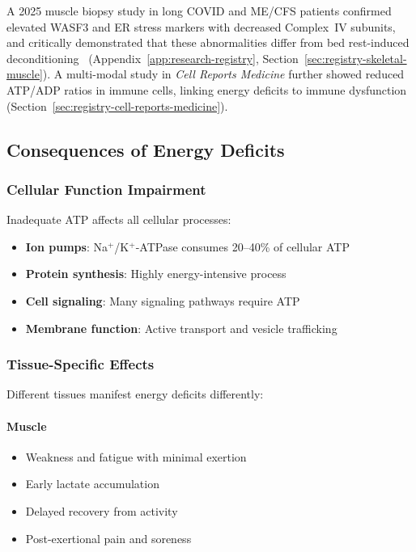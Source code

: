 A 2025 muscle biopsy study in long COVID and ME/CFS patients confirmed
elevated WASF3 and ER stress markers with decreased Complex~IV subunits,
and critically demonstrated that these abnormalities differ from bed
rest-induced deconditioning~\cite{SkeletalMuscle2025longCOVID}
(Appendix~\ref{app:research-registry},
Section~\ref{sec:registry-skeletal-muscle}).  A multi-modal study in
\textit{Cell Reports Medicine} further showed reduced ATP/ADP ratios in
immune cells, linking energy deficits to immune
dysfunction~\cite{CellReportsMedicine2025MECFS}
(Section~\ref{sec:registry-cell-reports-medicine}).

\subsection{Consequences of Energy Deficits}
\label{sec:energy-consequences}

\subsubsection{Cellular Function Impairment}

Inadequate ATP affects all cellular processes:

\begin{itemize}
    \item \textbf{Ion pumps}: Na$^+$/K$^+$-ATPase consumes 20--40\% of cellular ATP
    \item \textbf{Protein synthesis}: Highly energy-intensive process
    \item \textbf{Cell signaling}: Many signaling pathways require ATP
    \item \textbf{Membrane function}: Active transport and vesicle trafficking
\end{itemize}

\subsubsection{Tissue-Specific Effects}

Different tissues manifest energy deficits differently:

\paragraph{Muscle}
\begin{itemize}
    \item Weakness and fatigue with minimal exertion
    \item Early lactate accumulation
    \item Delayed recovery from activity
    \item Post-exertional pain and soreness
\end{itemize}

